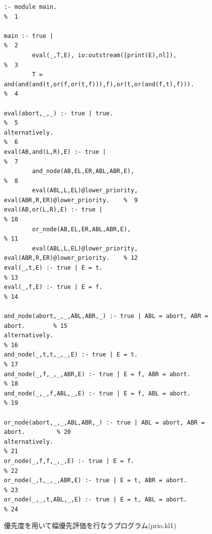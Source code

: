 \documentclass[a4,titlepage]{jsreport}
\begin{document}
\begin{figure}
\begin{center}
\begin{Verbatim}[baselinestretch=0.8]
% prio.kl1
:- module main.                                                          %  1

main :- true |                                                           %  2
        eval(_,T,E), io:outstream([print(E),nl]),                        %  3
        T = and(and(and(t,or(f,or(t,f))),f),or(t,or(and(f,t),f))).       %  4

eval(abort,_,_) :- true | true.                                          %  5
alternatively.                                                           %  6
eval(AB,and(L,R),E) :- true |                                            %  7
        and_node(AB,EL,ER,ABL,ABR,E),                                    %  8
        eval(ABL,L,EL)@lower_priority, eval(ABR,R,ER)@lower_priority.    %  9
eval(AB,or(L,R),E) :- true |                                             % 10
        or_node(AB,EL,ER,ABL,ABR,E),                                     % 11
        eval(ABL,L,EL)@lower_priority, eval(ABR,R,ER)@lower_priority.    % 12
eval(_,t,E) :- true | E = t.                                             % 13
eval(_,f,E) :- true | E = f.                                             % 14

and_node(abort,_,_,ABL,ABR,_) :- true | ABL = abort, ABR = abort.        % 15
alternatively.                                                           % 16
and_node(_,t,t,_,_,E) :- true | E = t.                                   % 17
and_node(_,f,_,_,ABR,E) :- true | E = f, ABR = abort.                    % 18
and_node(_,_,f,ABL,_,E) :- true | E = f, ABL = abort.                    % 19

or_node(abort,_,_,ABL,ABR,_) :- true | ABL = abort, ABR = abort.         % 20
alternatively.                                                           % 21
or_node(_,f,f,_,_,E) :- true | E = f.                                    % 22
or_node(_,t,_,_,ABR,E) :- true | E = t, ABR = abort.                     % 23
or_node(_,_,t,ABL,_,E) :- true | E = t, ABL = abort.                     % 24
\end{Verbatim}
\caption{優先度を用いて幅優先評価を行なうプログラム(prio.kl1)}
\label{andor_prio_kl1}
\end{center}
\end{figure}
\end{document}
